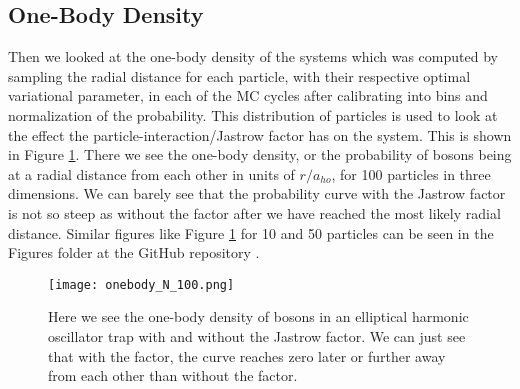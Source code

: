 \documentclass[12pt,a4paper,english]{article}
\begin{document}
\subsection{One-Body Density}
\label{subsect:Result_onbody}
Then we looked at the one-body density of the systems which was computed by sampling the radial distance for each particle, with their respective optimal variational parameter, in each of the MC cycles after calibrating into bins and normalization of the probability. This distribution of particles is used to look at the effect the particle-interaction/Jastrow factor has on the system. This is shown in Figure \ref{fig:onebody}. There we see the one-body density, or the probability of bosons being at a radial distance from each other in units of $r/a_{ho}$, for 100 particles in three dimensions. We can barely see that the probability curve with the Jastrow factor is not so steep as without the factor after we have reached the most likely radial distance. Similar figures like Figure \ref{fig:onebody} for 10 and 50 particles can be seen in the Figures folder at the GitHub repository \cite{GitHub}.

\begin{figure}[htbp!]
	\centering\texttt{[image: onebody\_N\_100.png]}
	\caption{Here we see the one-body density of bosons in an elliptical harmonic oscillator trap with and without the Jastrow factor. We can just see that with the factor, the curve reaches zero later or further away from each other than without the factor. \label{fig:onebody}}
\end{figure} 
\end{document}
